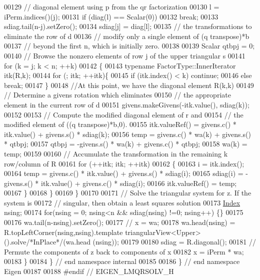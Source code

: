 \begin{DoxyCode}
00129       \textcolor{comment}{// diagonal element using p from the qr factorization}
00130       l = iPerm.indices()(j);
00131       \textcolor{keywordflow}{if} (diag(l) == Scalar(0)) 
00132         \textcolor{keywordflow}{break}; 
00133       sdiag.tail(n-j).setZero();
00134       sdiag[j] = diag[l];
00135       \textcolor{comment}{// the transformations to eliminate the row of d}
00136       \textcolor{comment}{// modify only a single element of (q transpose)*b}
00137       \textcolor{comment}{// beyond the first n, which is initially zero. }
00138       
00139       Scalar qtbpj = 0; 
00140       \textcolor{comment}{// Browse the nonzero elements of row j of the upper triangular s}
00141       \textcolor{keywordflow}{for} (k = j; k < n; ++k)
00142       \{
00143         \textcolor{keyword}{typename} FactorType::InnerIterator itk(R,k);
00144         \textcolor{keywordflow}{for} (; itk; ++itk)\{
00145           \textcolor{keywordflow}{if} (itk.index() < k) \textcolor{keywordflow}{continue};
00146           \textcolor{keywordflow}{else} \textcolor{keywordflow}{break};
00147         \}
00148         \textcolor{comment}{//At this point, we have the diagonal element R(k,k)}
00149         \textcolor{comment}{// Determine a givens rotation which eliminates }
00150         \textcolor{comment}{// the appropriate element in the current row of d}
00151         givens.makeGivens(-itk.value(), sdiag(k));
00152         
00153         \textcolor{comment}{// Compute the modified diagonal element of r and }
00154         \textcolor{comment}{// the modified element of ((q transpose)*b,0).}
00155         itk.valueRef() = givens.c() * itk.value() + givens.s() * sdiag(k);
00156         temp = givens.c() * wa(k) + givens.s() * qtbpj; 
00157         qtbpj = -givens.s() * wa(k) + givens.c() * qtbpj;
00158         wa(k) = temp;
00159         
00160         \textcolor{comment}{// Accumulate the transformation in the remaining k row/column of R}
00161         \textcolor{keywordflow}{for} (++itk; itk; ++itk)
00162         \{
00163           i = itk.index();
00164           temp = givens.c() *  itk.value() + givens.s() * sdiag(i);
00165           sdiag(i) = -givens.s() * itk.value() + givens.c() * sdiag(i);
00166           itk.valueRef() = temp;
00167         \}
00168       \}
00169     \}
00170     
00171     \textcolor{comment}{// Solve the triangular system for z. If the system is }
00172     \textcolor{comment}{// singular, then obtain a least squares solution}
00173     \hyperlink{namespace_eigen_a62e77e0933482dafde8fe197d9a2cfde}{Index} nsing;
00174     \textcolor{keywordflow}{for}(nsing = 0; nsing<n && sdiag(nsing) !=0; nsing++) \{\}
00175     
00176     wa.tail(n-nsing).setZero();
00177 \textcolor{comment}{//     x = wa; }
00178     wa.head(nsing) = R.topLeftCorner(nsing,nsing).template triangularView<Upper>().solve\textcolor{comment}{/*InPlace*/}(wa.head
      (nsing));
00179     
00180     sdiag = R.diagonal();
00181     \textcolor{comment}{// Permute the components of z back to components of x}
00182     x = iPerm * wa; 
00183 \}
00184 \} \textcolor{comment}{// end namespace internal}
00185 
00186 \} \textcolor{comment}{// end namespace Eigen}
00187 
00188 \textcolor{preprocessor}{#endif // EIGEN\_LMQRSOLV\_H}
\end{DoxyCode}
